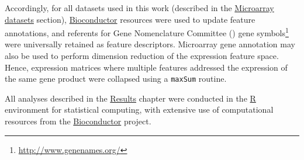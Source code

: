 Accordingly, for all datasets used in this work (described in the
\hyperref[sec:methods-datasets]{\textsf{Microarray datasets}} section),
\href{http://www.bioconductor.org/}{\textsf{Bioconductor}} resources were used
to update feature annotations, and referents for  Gene
Nomenclature Committee () gene
symbols\footnote{\href{http://www.genenames.org/}{http://www.genenames.org/}}
were universally retained as feature descriptors.  Microarray gene annotation
may also be used to perform dimension reduction of the expression feature space.
Hence, expression matrices where multiple features addressed the expression of
the same gene product were collapsed using a \texttt{maxSum}
routine.\cite{miller_strategies_2011}

All analyses described in the \hyperref[chap:results]{\textsf{Results}} chapter
were conducted in the \href{http://www.r-project.org/}{\textsf{R}} environment
for statistical computing,\cite{r_core_team_r:_2014} with extensive use of
computational resources from the
\href{http://www.bioconductor.org/}{\textsf{Bioconductor}}
project.\cite{gentleman_bioconductor:_2004}





